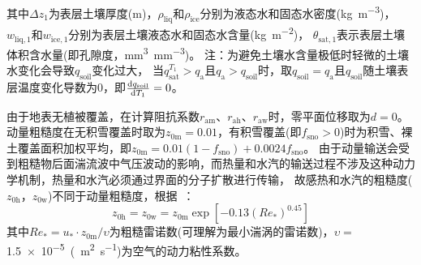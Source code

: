 其中$\Delta z_{1}$为表层土壤厚度(m)，$\rho_{\mathrm{liq}}$和$\rho_{\mathrm{ice}}$分别为液态水和固态水密度(\unit{kg.m^{-3}})，
$w_{\mathrm{liq,1}}$和$w_{\mathrm{ice,1}}$分别为表层土壤液态水和固态水含量(\unit{kg.m^{-2}})，
$\theta_{\mathrm{sat,1}}$表示表层土壤体积含水量(即孔隙度，\unit{mm^3.mm^{-3}})。
注：为避免土壤水含量极低时轻微的土壤水变化会导致$q_{\mathrm{soil}}$变化过大，
当$q_{\mathrm{sat}}^{T_1}>q_{\mathrm{a}}$且$q_{\mathrm{a}}>q_{\mathrm{soil}}$时，取$q_{\mathrm{soil}} = q_{\mathrm{a}}$且$q_{\mathrm{soil}}$随土壤表层温度变化导数为0，即$\frac{{\rm d}q_{\mathrm{soil}}}{{\rm d}T_1} = 0$。


由于地表无植被覆盖，在计算阻抗系数$r_{\mathrm{am}}$、$r_{\mathrm{ah}}$、$r_{\mathrm{aw}}$时，零平面位移取为$d=0$。动量粗糙度在无积雪覆盖时取为$z_{\mathrm{0m}}=0.01$，有积雪覆盖(即$f_{\mathrm{sno}}>0$)时为积雪、裸土覆盖面积加权平均，即$z_{\mathrm{0m}}=0.01\left( 1-f_{\mathrm{sno}} \right )+ 0.0024 f_{\mathrm{sno}}$。
由于动量输送会受到粗糙物后面湍流波中气压波动的影响，而热量和水汽的输送过程不涉及这种动力学机制，热量和水汽必须通过界面的分子扩散进行传输，
故感热和水汽的粗糙度($z_{\mathrm{0h}}$，$z_{\mathrm{0w}}$)不同于动量粗糙度，根据~\citet{zeng1998effect}：
\begin{equation}\label{z0hw}
  z_{\mathrm{0 h}} = z_{\mathrm{0 w}} = z_{\mathrm{0 m}} \exp \left[-0.13\left(Re_{*}\right)^{0.45}\right]
\end{equation}
其中$Re_{*} = u_{*} \cdot z_{\mathrm{0 m}} / \upsilon$为粗糙雷诺数(可理解为最小湍涡的雷诺数)，$\upsilon=$ \qty{1.5e-5}{(m^2.s^{-1}})为空气的动力粘性系数。


